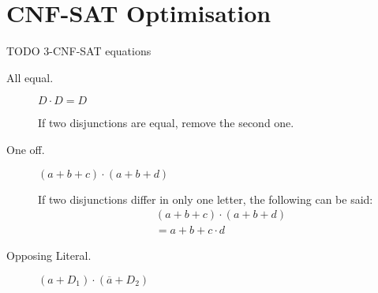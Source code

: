 \documentclass[12pt, letterpaper]{article}
\begin{document}
    \section{CNF-SAT Optimisation}

    TODO 3-CNF-SAT equations

    \begin{multicols}{2}%
    \setlength{\parindent}{0pt}%
    \begin{minipage}[t]{\linewidth}%
        \begin{minipage}[t]{\linewidth-2\fboxsep-2\fboxrule}
            \begin{description}
                \item[All equal.] {
                    $D\cdot D = D$
                
                    If two disjunctions are equal, remove
                    the second one.
                }
                \item[One off.] {
                    $(a+b+c)\cdot(a+b+d)$
                
                    If two disjunctions differ in only one
                    letter, the following can be said:
                    \begin{equation}
                        \nonumber
                        \begin{aligned}
                            (a+b+c)\cdot(a+b+d)\\
                            = a+b+c\cdot d
                        \end{aligned}
                    \end{equation}
                }
            \end{description}
        \end{minipage}
        
    \end{minipage}
    
    \begin{minipage}[t]{\linewidth}%
        \begin{minipage}[t]{\linewidth-2\fboxsep-2\fboxrule}%
            \begin{description}
                \item[Opposing Literal.] {
                    $(a+D_1)\cdot(\overline a+D_2)$

}
\end{description}
\end{minipage}
\end{minipage}
\end{multicols}
\end{document}
